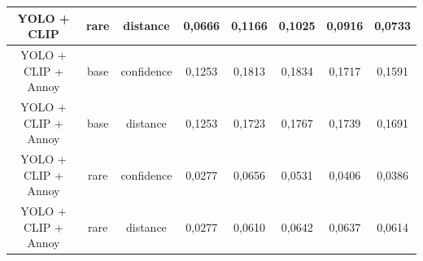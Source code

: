 \documentclass[a4paper,14pt]{article}
\begin{document}
\begin{landscape}
\begin{table}[H]
\begin{tabular}{ccc|ccccc|}
                YOLO + CLIP         & rare    & distance   & \textbf{0,0666} & \textbf{0,1166} & 0,1025          & 0,0916          & 0,0733          \\ \hline
                YOLO + CLIP + Annoy & base    & confidence & 0,1253          & 0,1813          & 0,1834          & 0,1717          & 0,1591          \\
                YOLO + CLIP + Annoy & base    & distance   & 0,1253          & 0,1723          & 0,1767          & 0,1739          & 0,1691          \\
                YOLO + CLIP + Annoy & rare    & confidence & 0,0277          & 0,0656          & 0,0531          & 0,0406          & 0,0386          \\
                YOLO + CLIP + Annoy & rare    & distance   & 0,0277          & 0,0610          & 0,0642          & 0,0637          & 0,0614          \\
                \bottomrule
            \end{tabular}
        \end{table}
    \end{landscape}
\end{document}
